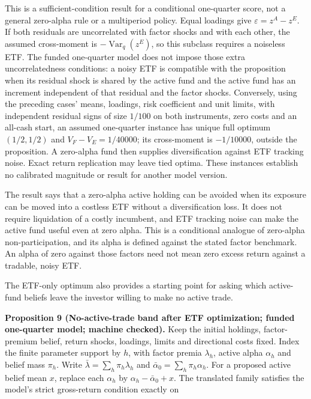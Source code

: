 \documentclass[11pt]{article}
\begin{document}
This is a sufficient-condition result for a conditional one-quarter
score, not a general zero-alpha rule or a multiperiod policy. Equal
loadings give \(\varepsilon=z^A-z^E\). If both residuals are
uncorrelated with factor shocks and with each other, the assumed
cross-moment is \(-\operatorname{Var}_q(z^E)\), so this subclass
requires a noiseless ETF. The funded one-quarter model does not impose those extra
uncorrelatedness conditions: a noisy ETF is compatible with the
proposition when its residual shock is shared by the active fund
and the active fund has an increment independent of that residual
and the factor shocks. Conversely, using the preceding cases'
means, loadings, risk coefficient and unit limits, with independent
residual signs of size \(1/100\) on both instruments, zero costs
and an all-cash start, an assumed one-quarter
instance has unique full optimum \((1/2,1/2)\) and
\(V_F-V_E=1/40000\); its cross-moment is \(-1/10000\), outside
the proposition. A zero-alpha fund then supplies diversification
against ETF tracking noise. Exact return replication may leave tied
optima. These instances establish no calibrated magnitude or
result for another model version.

The result says that a zero-alpha active holding can be avoided
when its exposure can be moved into a costless ETF without a
diversification loss. It does not require liquidation of a costly
incumbent, and ETF tracking noise can make the active fund useful
even at zero alpha. This is a conditional analogue of zero-alpha
non-participation, and its alpha is defined against the stated
factor benchmark. An alpha of zero against those factors need not
mean zero excess return against a tradable, noisy ETF.

The ETF-only optimum also provides a starting point for asking which
active-fund beliefs leave the investor willing to make no active trade.

\label{res:Proposition-9}
\textbf{Proposition 9 (No-active-trade band after ETF optimization; funded one-quarter model; machine checked).}
Keep the initial holdings, factor-premium belief, return shocks, loadings,
limits and directional costs fixed. Index the finite parameter support by
\(h\), with factor premia \(\lambda_h\), active alpha \(\alpha_h\) and
belief mass \(\pi_h\). Write
\(\bar\lambda=\sum_h\pi_h\lambda_h\) and
\(\bar\alpha_0=\sum_h\pi_h\alpha_h\). For a proposed active belief mean
\(x\), replace each \(\alpha_h\) by
\(\alpha_h-\bar\alpha_0+x\). The translated family satisfies the
model's strict gross-return condition exactly on
\end{document}
